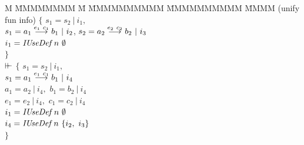 \clearpage{}
\begin{tabbing}
M \= MMMMMMMM \= M \= MMMMMMMMMM \= MMMMMMMMMM \= MMMM \kill
	\> (unify fun info)	
		\> $\{$ \> $s_1 = s_2 \ | \ i_1,$  \\
	\>	\> 	\> $s_1 = a_1 \lfuna{e_1 \ c_1} b_1 \ | \ i_2$,
			\> $s_2 = a_2 \stackrel{e_2 \ c_2}{\longrightarrow} b_2 \ | \ i_3$ \\
	\>	\>	\> $i_1 = \operatorname{\mathit{IUseDef}} n \ \emptyset$ \\
	\>	\> $\}$ 
	\\[1em]
	\> \qq $\vdash\mkern-6mu\vdash$ 
		\> $\{$	\> $s_1 = s_2 \ | \ i_1,$ \\
	\>	\>	\> $s_1 = a_1 \lfuna{e_1 \ c_1} b_1 \ | \ i_4$ \\
	\> 	\>	\> $a_1 = a_2 \ | \ i_4,$ \> $b_1 = b_2 \ | \ i_4$ \\
	\> 	\>	\> $e_1 = e_2 \ | \ i_4,$ \> $c_1 = c_2 \ | \ i_4$ \\
	\>	\>	\> $i_1 = \operatorname{\mathit{IUseDef}} n \ \emptyset$ \\
	\>	\>	\> $i_4 = \operatorname{\mathit{IUseDef}} n \ \{ i_2, \ i_3 \}$ \\
	\>	\> $\}$	 
\end{tabbing}

